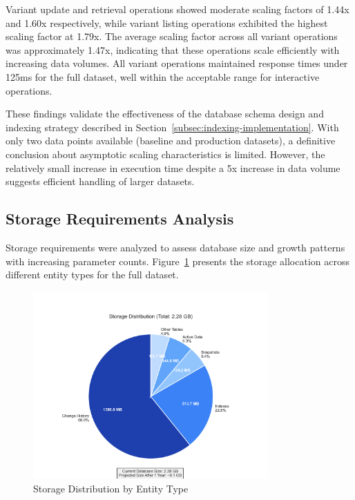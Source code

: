 Variant update and retrieval operations showed moderate scaling factors of 1.44x and 1.60x respectively, while variant listing operations exhibited the highest scaling factor at 1.79x. The average scaling factor across all variant operations was approximately 1.47x, indicating that these operations scale efficiently with increasing data volumes. All variant operations maintained response times under 125ms for the full dataset, well within the acceptable range for interactive operations.

These findings validate the effectiveness of the database schema design and indexing strategy described in Section~\ref{subsec:indexing-implementation}. With only two data points available (baseline and production datasets), a definitive conclusion about asymptotic scaling characteristics is limited. However, the relatively small increase in execution time despite a 5x increase in data volume suggests efficient handling of larger datasets.

\subsection{Storage Requirements Analysis}
\label{subsec:storage-requirements-analysis}

Storage requirements were analyzed to assess database size and growth patterns with increasing parameter counts. Figure~\ref{fig:storage-analysis} presents the storage allocation across different entity types for the full dataset.

\begin{figure}[h]
    \centering
    \includegraphics[width=0.8\textwidth]{figures/storage_distribution.png}
    \caption{Storage Distribution by Entity Type}
    \label{fig:storage-analysis}
\end{figure}

